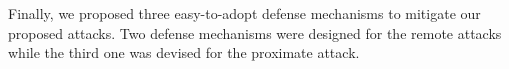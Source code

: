 Finally, we proposed three easy-to-adopt defense mechanisms to mitigate our proposed attacks. Two defense mechanisms were designed for the remote attacks while the third one was devised for the proximate attack.


